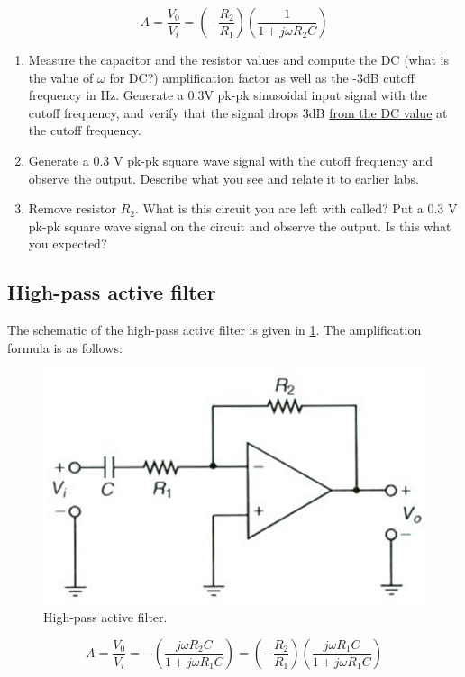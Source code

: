 \documentclass[11pt,letterpaper]{article}
\begin{document}
\begin{equation} \label{Eqn:OpAmpsPassiveFilters3}
A = \dfrac{V_0}{V_i} = \left( - \dfrac{R_2}{R_1} \right)  \left(  \dfrac{1}{1 + j \omega R_2 C}  \right) 
\end{equation}

\begin{enumerate}
\item Measure the capacitor and the resistor values and compute the DC (what is the value of $\omega$ for DC?) amplification factor as well as the -3dB cutoff frequency in Hz. Generate a 0.3V pk-pk sinusoidal input signal with the cutoff frequency, and verify that the signal drops 3dB \underline{from the DC value} at the cutoff frequency. 
\item Generate a 0.3 V pk-pk square wave signal with the cutoff frequency and observe the output. Describe what you see and relate it to earlier labs.
\item Remove resistor $R_2$. What is this circuit you are left with called? Put a 0.3 V pk-pk square wave signal on the circuit and observe the output. Is this what you expected?
\end{enumerate}

\subsection{High-pass active filter}

The schematic of the high-pass active filter is given in \ref{fig:Lab5_HighPassActiveFilter}. The amplification formula is as follows:

\begin{figure}
\centering
\includegraphics[width=0.6\linewidth]{Lab5_HighPassActiveFilter}
\caption{High-pass active filter.}
\label{fig:Lab5_HighPassActiveFilter}
\end{figure}

\begin{equation} \label{Eqn:OpAmpsPassiveFilters4}
A = \dfrac{V_0}{V_i} = - \left(  \dfrac{j \omega R_2 C}{1 + j \omega R_1 C}  \right) = \left( - \dfrac{R_2}{R_1}\right) \left(  \dfrac{j \omega R_1 C}{1 + j \omega R_1 C} \right)  
\end{equation}
\end{document}
